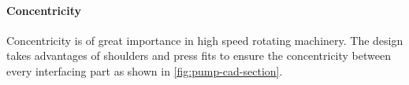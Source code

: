 \paragraph{Concentricity} Concentricity is of great importance in high speed rotating machinery. The design takes advantages of shoulders and press fits to ensure the concentricity between every interfacing part as shown in \cref{fig:pump-cad-section}. 





